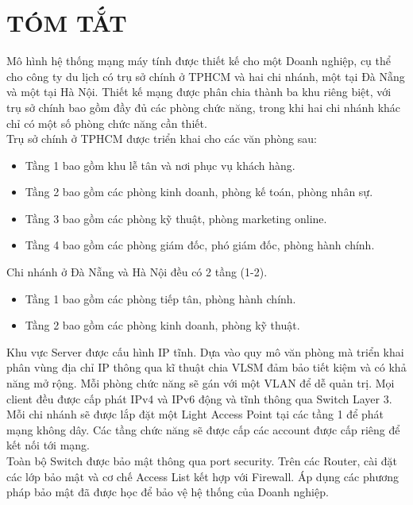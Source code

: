 \documentclass[12pt,a4paper]{report}
\renewcommand{\figurename}{\fontsize{12pt}{0pt}\selectfont Hình}
\renewcommand{\tablename}{\fontsize{12pt}{0pt}\selectfont Bảng}
\begin{document}
{\let\oldnumberline\numberline
\renewcommand{\numberline}{\figurename~\oldnumberline}
\listoffigures} %
\cleardoublepage


{\let\oldnumberline\numberline
\renewcommand{\numberline}{\tablename~\oldnumberline}
\listoftables}%
\cleardoublepage


\section*{TÓM TẮT}
\hspace*{1cm}Mô hình hệ thống mạng máy tính được thiết kế cho một Doanh nghiệp, cụ thể cho công ty du lịch có trụ sở chính ở TPHCM và hai chi nhánh, một tại Đà Nẵng và một tại Hà Nội. Thiết kế mạng được phân chia thành ba khu riêng biệt, với trụ sở chính bao gồm đầy đủ các phòng chức năng, trong khi hai chi nhánh khác chỉ có một số phòng chức năng cần thiết.\\
\hspace*{1cm}Trụ sở chính ở TPHCM được triển khai cho các văn phòng sau:
\begin{itemize}
\item Tầng 1 bao gồm khu lễ tân và nơi phục vụ khách hàng.
\item Tầng 2 bao gồm các phòng kinh doanh, phòng kế toán, phòng nhân sự.
 \item Tầng 3 bao gồm các phòng kỹ thuật, phòng marketing online. 
\item Tầng 4 bao gồm các phòng giám đốc, phó giám đốc, phòng hành chính.
\end{itemize}
\hspace*{1cm}Chi nhánh ở Đà Nẵng và Hà Nội đều có 2 tầng (1-2).
\begin{itemize}
\item Tầng 1 bao gồm các phòng tiếp tân, phòng hành chính.
\item Tầng 2 bao gồm các phòng kinh doanh, phòng kỹ thuật.
\end{itemize}
\hspace*{1cm}Khu vực Server được cấu hình IP tĩnh. Dựa vào quy mô văn phòng mà triển khai phân vùng địa chỉ IP thông qua kĩ thuật chia VLSM đảm bảo tiết kiệm và có khả năng mở rộng. Mỗi phòng chức năng sẽ gán với một VLAN để dễ quản trị. Mọi client đều được cấp phát IPv4 và IPv6 động và tĩnh thông qua Switch Layer 3.\\
\hspace*{1cm}Mỗi chi nhánh sẽ được lắp đặt một Light Access Point tại các tầng 1 để phát mạng không dây. Các tầng chức năng sẽ được cấp các account được cấp riêng để kết nối tới mạng.\\
\hspace*{1cm}Toàn bộ Switch được bảo mật thông qua port security. Trên các Router, cài đặt các lớp bảo mật và cơ chế Access List kết hợp với Firewall. Áp dụng các phương pháp bảo mật đã được học để bảo vệ hệ thống của Doanh nghiệp.
\cleardoublepage
\end{document}
